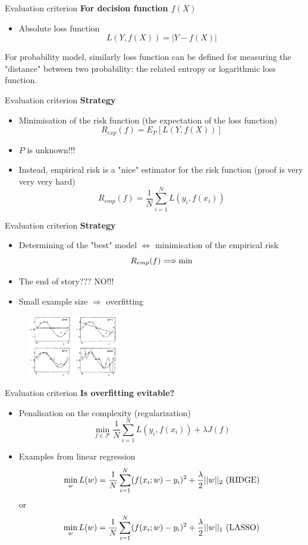 \documentclass{beamer}
\begin{document}
\begin{frame}{Evaluation criterion}
\textbf{For decision function $f(X)$}
\begin{itemize}
\item Absolute loss function
$$
L(Y, f(X)) = |Y-f(X)|
$$
\end{itemize}
For probability model, similarly loss function can be defined for measuring the "distance" between two probability: the related entropy or logarithmic loss function.
\end{frame}

\begin{frame}{Evaluation criterion}
\textbf{Strategy}
\begin{itemize}
\item Minimisation of the risk function (the expectation of the loss function)
$$
R_{exp}(f) = E_{P}[L(Y, f(X))]
$$
\item $P$ is unknown!!!
\item Instead, empirical risk is a "nice" estimator for the risk function (proof is very very very hard)
$$
R_{emp}(f) = \frac{1}{N}\sum^N_{i=1}L(y_i, f(x_i))
$$
\end{itemize}
\end{frame}

\begin{frame}{Evaluation criterion}
\textbf{Strategy}
\begin{itemize}
\item Determining of the "best" model $\Longleftrightarrow$ minimisation of the empirical risk
$$
R_{emp}(f) \Longrightarrow {\rm min}
$$
\item The end of story??? NO!!!
\item Small example size $\Longrightarrow$ overfitting
\end{itemize}
\begin{figure}
\centering
\includegraphics[width=4cm]{ep18.png}
\end{figure}
\end{frame}

\begin{frame}{Evaluation criterion}
\textbf{Is overfitting evitable?}
\begin{itemize}
\item Penalisation on the complexity (regularization)
$$
\min_{f\in \mathcal{F}} \frac{1}{N} \sum^N_{i=1} L(y_i, f(x_i)) + \lambda J(f)
$$
\item Examples from linear regression
$$
\min_w L(w) = \frac{1}{N} \sum^N_{i=1} (f(x_i; w) - y_i)^2 +\frac{\lambda}{2}||w||_2\ {\rm (RIDGE)}
$$
or 
$$
\min_w L(w) = \frac{1}{N} \sum^N_{i=1} (f(x_i; w) - y_i)^2 +\frac{\lambda}{2}||w||_1\ {\rm (LASSO)}
$$
\end{itemize}
\end{frame}
\end{document}
